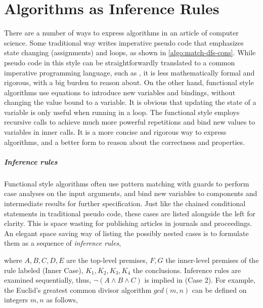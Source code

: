 \chapter{Algorithms as Inference Rules}\label{app:infer}

There are a number of ways to express algorithms in an article of computer science.
Some traditional way writes imperative pseudo code that emphasizes state changing (assignments) and loops, as shown in \autoref{algo:match-dfs-cons}.
While pseudo code in this style can be straightforwardly translated to a common imperative programming language, such as {\CPP},
it is less mathematically formal and rigorous, with a big burden to reason about.
On the other hand, functional style algorithms use equations to introduce new variables and bindings, without changing the value bound to a variable.
It is obvious that updating the state of a variable is only useful when running in a loop.
The functional style employs recursive calls to achieve much more powerful repetitions and bind new values to variables in inner calls.
It is a more concise and rigorous way to express algorithms, and a better form to reason about the correctness and properties.

\paragraph{Inference rules}
Functional style algorithms often use pattern matching with guards to perform case analyses on the input arguments, and
bind new variables to components and intermediate results for further specification.
Just like the chained conditional statements in traditional pseudo code, these cases are listed alongside the left for clarity.
This is space wasting for publishing articles in journals and proceedings.
An elegant space saving way of listing the possibly nested cases is to formulate them as a sequence of {\em inference rules},
where $A,B,C,D,E$ are the top-level premises, $F,G$ the inner-level premises of the rule labeled ({\sc Inner Case}), $K_1, K_2, K_3, K_4$ the conclusions.
Inference rules are examined sequentially, thus, $\neg(A \wedge B \wedge C)$ is implied in ({\sc Case 2}).
For example, the Euclid's greatest common divisor algorithm $\mathit{gcd}(m, n)$ can be defined on integers $m,n$ as follows,

